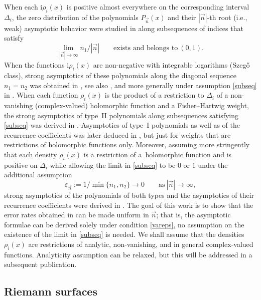 \documentclass[10pt,a4paper]{amsart}
\numberwithin{equation}{section}
\newcommand{\n}{{\vec n}}
\newcommand{\ic}{\mathrm{i}}
\begin{document}
When each $ \ic\rho_i(x) $ is positive almost everywhere on the corresponding interval $ \Delta_i $, the zero distribution of the polynomials $ P_\n(x) $ and their $ |\n| $-th root (i.e., weak) asymptotic behavior were studied in \cite{GRakh81} along subsequences of indices that satisfy
\begin{equation}
\label{subseq}
\lim_{|\n|\to\infty}n_1/|\n| \qquad \text{exists and belongs to} \ (0,1).
\end{equation}
When the functions $ \ic\rho_i(x) $ are non-negative with integrable logarithms (Szeg\H{o} class), strong asymptotics of these polynomials along the diagonal sequence $ n_1=n_2 $ was obtained in \cite{Ap88}, see also \cite{Kal79,NutTr87}, and more generally under assumption \eqref{subseq} in \cite{uApDenYa}. When each function $ \rho_i(x) $ is the product of a restriction to $ \Delta_i $ of a non-vanishing (complex-valued) holomorphic function and a Fisher--Hartwig weight, the strong asymptotics of type~II polynomials along subsequences satisfying \eqref{subseq} was derived in \cite{Ya16}. Asymptotics of type~I polynomials as well as of the recurrence coefficients was later deduced in \cite{ApDenYa20}, but just for weights that are restrictions of holomorphic functions only. Moreover, assuming more stringently that each density $ \rho_i(x) $ is a restriction of a~holomorphic function and is positive on $ \Delta_i $ while allowing the limit in \eqref{subseq} to be $ 0 $ or $ 1 $ under the additional assumption
\begin{equation}
\label{vareps}
\varepsilon_\n := 1/\min\{n_1,n_2\} \to 0 \qquad \text{as} \ |\n|\to\infty,
\end{equation}
strong asymptotics of the polynomials of both types and the asymptotics of their recurrence coefficients were derived in \cite{ApDenYa21}. The goal of this work is to show that the error rates obtained in \cite{ApDenYa21} can be made uniform in $ \n $; that is, the asymptotic formulae can be derived solely under condition \eqref{vareps}, no assumption on the existence of the limit in \eqref{subseq} is needed. We shall assume that the densities $ \rho_i(x) $ are restrictions of analytic, non-vanishing, and in general complex-valued functions. Analyticity assumption can be relaxed, but this will be addressed in a subsequent publication.

\subsection{Riemann surfaces}
\end{document}
